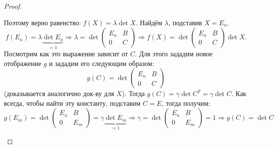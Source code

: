 \begin{proof}
\begin{enumerate}
             Поэтому верно равенство: $f(X) = \lambda \det X$. Найдём $\lambda$, подставив
             $X = E_n$.
             \begin{equation}
                 \label{eq:8:1}
                 f(E_n) = \lambda \underbrace{\det E_n}_{=1} \Rightarrow \lambda =
                 \det \left(\begin{array}{c|c}
                         E_n & B\\
                         \hline
                         0 & C
                 \end{array}\right)
                 \Rightarrow
                 f(X) = 
                 \det \left(\begin{array}{c|c}
                         E_n & B\\
                         \hline
                         0 & C
                 \end{array}\right)
                 \det X
             .\end{equation}
             Посмотрим как это выражение зависит от $C$. 
             Для этого зададим новое отображение $g$ и зададим его следующим образом:
             \[
                 g(C) = 
                 \det \left(\begin{array}{c|c}
                         E_n & B \\
                         \hline
                         0 & C
                 \end{array}\right)
             \] 
             (доказывается аналогично док-ву для $X$). 
             Тогда $g(C) = \gamma \det C^T = \gamma \det C$. Как всегда, чтобы найти
             эту константу, подставим $C = E$, тогда получим:
             \[
                 g(E_m) = 
                 \det \left(\begin{array}{c|c}
                         E_n & B \\
                         \hline
                         0 & E_m
                 \end{array}\right)
                 = \gamma \underbrace{\det E_m}_{=1} 
                 \Rightarrow \gamma = 
                 \det \left(\begin{array}{c|c}
                         E_n & B \\
                         \hline
                         0 & E_m
                 \end{array}\right) = 1
                 \Rightarrow g(C) = \det C
             \]


\end{enumerate}
\end{proof}
